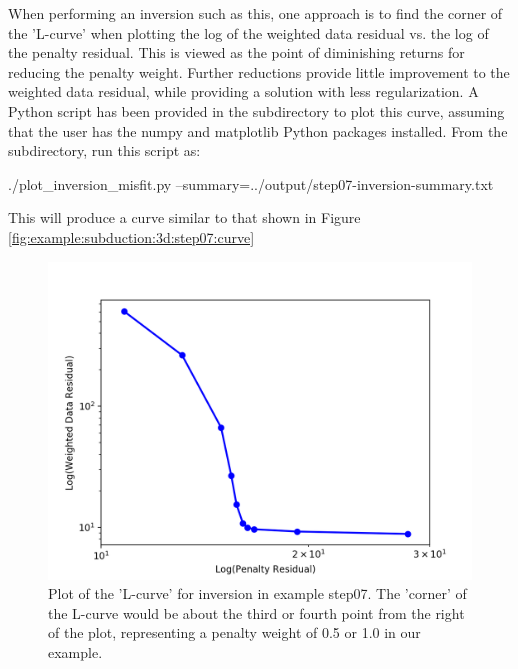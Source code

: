 When performing an inversion such as this, one approach is to find the
corner of the 'L-curve' when plotting the log of the weighted data
residual vs. the log of the penalty residual. This is viewed as the
point of diminishing returns for reducing the penalty
weight. Further reductions provide little improvement to the
weighted data residual, while providing a solution with less
regularization. A Python script has been provided in the
 subdirectory to plot this curve, assuming that the user
has the numpy and matplotlib Python packages installed. From the
 subdirectory, run this script as:
\begin{shell}
./plot_inversion_misfit.py
--summary=../output/step07-inversion-summary.txt
\end{shell}
This will produce a curve similar to that shown in Figure
\vref{fig:example:subduction:3d:step07:curve}
\begin{figure}
  \includegraphics[width=4.5in]{examples/figs/subduction3d_step07_inverse_curve}
  \caption{Plot of the 'L-curve' for inversion in example step07. The
    'corner' of the L-curve would be about the third or fourth point
    from the right of the plot, representing a penalty weight of 0.5
    or 1.0 in our example. }
  \label{fig:example:subduction:3d:step07:curve}
\end{figure}

